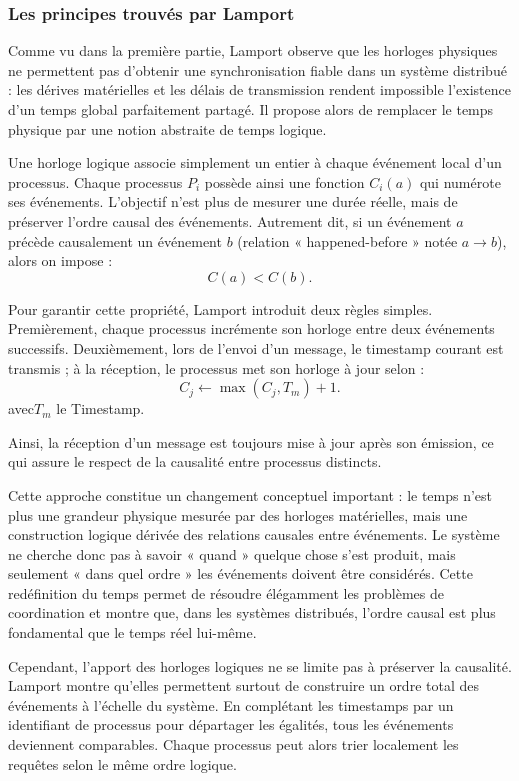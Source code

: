 \documentclass[12pt,a4paper]{article}
\begin{document}
\subsubsection{Les principes trouvés par Lamport}

Comme vu dans la première partie, Lamport observe que les horloges physiques ne permettent pas d’obtenir une synchronisation fiable dans un système distribué : les dérives matérielles et les délais de transmission rendent impossible l’existence d’un temps global parfaitement partagé. Il propose alors de remplacer le temps physique par une notion abstraite de temps logique. 

Une horloge logique associe simplement un entier à chaque événement local d’un processus. Chaque processus $P_i$ possède ainsi une fonction $C_i(a)$ qui numérote ses événements. L’objectif n’est plus de mesurer une durée réelle, mais de préserver l’ordre causal des événements. Autrement dit, si un événement $a$ précède causalement un événement $b$ (relation « happened-before » notée $a \rightarrow b$), alors on impose :
\[
C(a) < C(b).
\]

Pour garantir cette propriété, Lamport introduit deux règles simples. Premièrement, chaque processus incrémente son horloge entre deux événements successifs. Deuxièmement, lors de l’envoi d’un message, le timestamp courant est transmis ; à la réception, le processus met son horloge à jour selon :
\[
C_j \leftarrow \max(C_j, T_m) + 1.
\]
avec$T_m$ le Timestamp.

Ainsi, la réception d’un message est toujours mise à jour après son émission, ce qui assure le respect de la causalité entre processus distincts.

Cette approche constitue un changement conceptuel important : le temps n’est plus une grandeur physique mesurée par des horloges matérielles, mais une construction logique dérivée des relations causales entre événements. Le système ne cherche donc pas à savoir « quand » quelque chose s’est produit, mais seulement « dans quel ordre » les événements doivent être considérés. Cette redéfinition du temps permet de résoudre élégamment les problèmes de coordination et montre que, dans les systèmes distribués, l’ordre causal est plus fondamental que le temps réel lui-même.

Cependant, l’apport des horloges logiques ne se limite pas à préserver la causalité. Lamport montre qu’elles permettent surtout de construire un ordre total des événements à l’échelle du système. En complétant les timestamps par un identifiant de processus pour départager les égalités, tous les événements deviennent comparables. Chaque processus peut alors trier localement les requêtes selon le même ordre logique.
\end{document}
